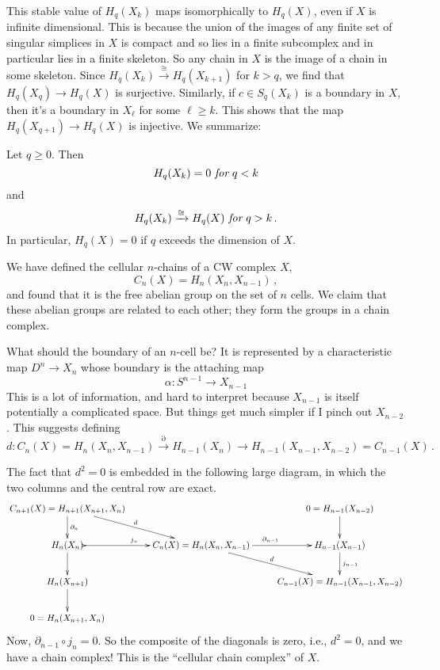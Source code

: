 This stable value of $H_q(X_k)$ maps isomorphically to $H_q(X)$, 
even if $X$ is infinite 
dimensional. This is because the union of the images of any finite set of 
singular simplices in $X$ is compact and so lies in a finite subcomplex and in
particular lies in a finite skeleton. So any chain in $X$ is the image of 
a chain in some skeleton. Since $H_q(X_k)\xrightarrow{\cong}H_q(X_{k+1})$ for 
$k>q$, we find that $H_q(X_q)\to H_q(X)$ is surjective. Similarly, 
if $c\in S_q(X_k)$ is a boundary in $X$, then it's a boundary in $X_\ell$ 
for some $\ell\geq k$. This shows that the map $H_q(X_{q+1})\to H_q(X)$ is
injective. We summarize:
\begin{prop} 
Let $q\geq 0$. Then 
\[
H_q(X_k)=0\,\,\hbox{\em for}\,\,q<k
\]
and
\[
H_q(X_k)\xrightarrow{\cong}H_q(X)\,\,\hbox{\em for}\,\,q>k\,.
\]
In particular, $H_q(X)=0$ if $q$ exceeds the dimension of $X$. 
\end{prop}

We have defined the cellular $n$-chains of a CW complex $X$,
\[
C_n(X)=H_n(X_n,X_{n-1})\,,
\]
and found that it is the free abelian group on the set of $n$ cells. 
We claim that these abelian groups are related to each other; they form 
the groups in a chain complex. 

What should the boundary of an $n$-cell be? It is represented by 
a characteristic map $D^n\to X_n$ whose boundary is the attaching map 
\[
\alpha:S^{n-1}\to X_{n-1}
\]
This is a lot of information, and hard to interpret because $X_{n-1}$ is itself
potentially a complicated space. But things get much simpler if I pinch out
$X_{n-2}$. This suggests defining 
\[
d:C_n(X)=H_n(X_n,X_{n-1})\xrightarrow{\partial} H_{n-1}(X_n)\rightarrow 
H_{n-1}(X_{n-1},X_{n-2})=C_{n-1}(X)\,.
\]

The fact that $d^2=0$ is embedded in the following large diagram, in which 
the two columns and the central row are exact. 
\begin{equation*}
\xymatrix{C_{n+1}(X)= H_{n+1}(X_{n+1},X_n)\ar[d]^{\partial_n}\ar[dr]^d & & 0= H_{n-1}(X_{n-2})\ar[d]\\
 H_n(X_n)\ar@{>->}[r]^{j_n}\ar[d] & C_n(X)= H_n(X_n,X_{n-1})\ar[r]^{\partial_{n-1}}\ar[dr]^d & H_{n-1}(X_{n-1})\ar[d]^{j_{n-1}}\\
 H_n(X_{n+1})\ar[d] & & C_{n-1}(X)= H_{n-1}(X_{n-1},X_{n-2})\\
0 = H_n(X_{n+1},X_n)}
\end{equation*}
Now, $\partial_{n-1}\circ j_n=0$. So the composite of the diagonals is zero, i.e., $d^2=0$, and we have a chain complex! This is the ``cellular chain complex'' of $X$. 

